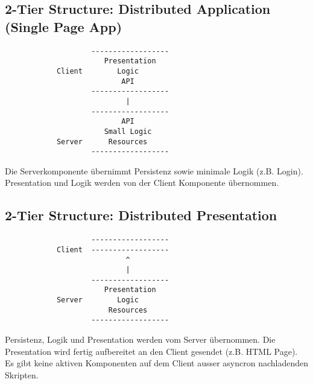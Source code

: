 		\subsection{2-Tier Structure: Distributed Application (Single Page App)}
			\begin{verbatim}
			        ------------------
			           Presentation
			Client        Logic
			               API
			        ------------------
			                |
			        ------------------
			               API
			           Small Logic
			Server      Resources
			        ------------------		
			\end{verbatim}
			Die Serverkomponente übernimmt Persistenz sowie minimale Logik (z.B. Login).
			Presentation und Logik werden von der Client Komponente übernommen.
			
		\subsection{2-Tier Structure: Distributed Presentation}
			\begin{verbatim}
			        ------------------
			Client  ------------------   
			                ^
			                |
			        ------------------
			           Presentation
			Server        Logic
			            Resources
			        ------------------		
			\end{verbatim}
			Persistenz, Logik und Presentation werden vom Server übernommen.
			Die Presentation wird fertig aufbereitet an den Client gesendet (z.B. HTML Page).
			Es gibt keine aktiven Komponenten auf dem Client ausser asyncron nachladenden Skripten.
			
			
		

